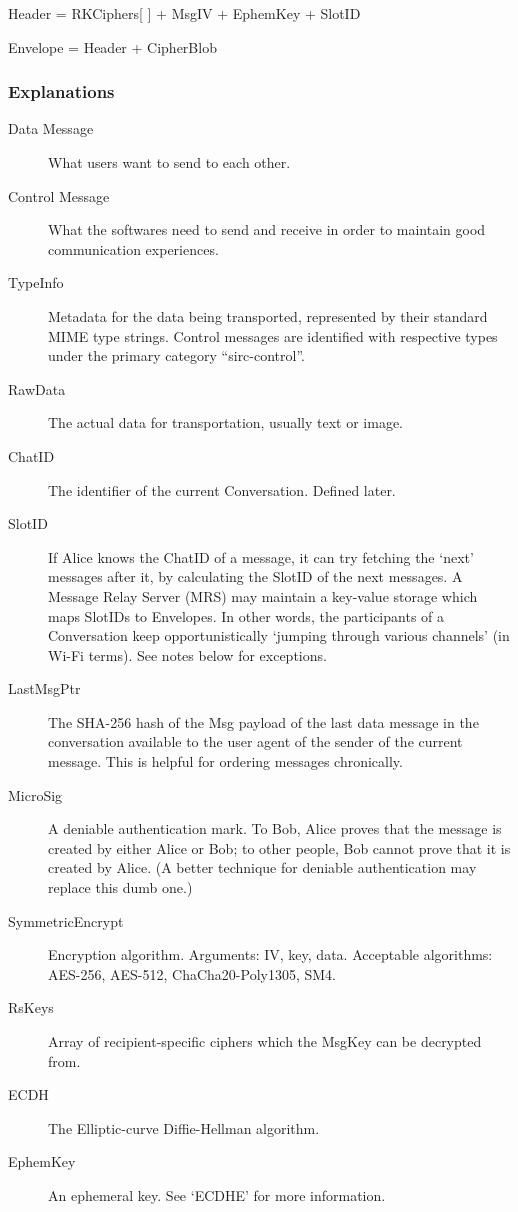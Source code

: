 \documentclass[a4paper,11pt]{article}
\begin{document}
\istep Header = RKCiphers[ ] + MsgIV + EphemKey + SlotID

\istep Envelope = Header + CipherBlob

\istepend

\subsubsection{Explanations}

\begin{description}
    \item[Data Message] What users want to send to each other.
    \item[Control Message] What the softwares need to send and receive in order to maintain good communication experiences.
    \item[TypeInfo] Metadata for the data being transported, represented by their standard MIME type strings.
        Control messages are identified with respective types under the primary category ``sirc-control''.
    \item[RawData] The actual data for transportation, usually text or image.
    \item[ChatID] The identifier of the current Conversation. Defined later.
    \item[SlotID] If Alice knows the ChatID of a message, it can try fetching the `next' messages after it, by calculating the SlotID of the next messages. A Message Relay Server (MRS) may maintain a key-value storage which maps SlotIDs to Envelopes. In other words, the participants of a Conversation keep opportunistically `jumping through various channels' (in Wi-Fi terms). See notes below for exceptions.
    \item[LastMsgPtr] The SHA-256 hash of the Msg payload of the last data message in the conversation available to the user agent of the sender of the current message. This is helpful for ordering messages chronically.
    \item[MicroSig] A deniable authentication mark. To Bob, Alice proves that the message is created by either Alice or Bob; to other people, Bob cannot prove that it is created by Alice. (A better technique for deniable authentication may replace this dumb one.)
    \item[SymmetricEncrypt] Encryption algorithm. Arguments: IV, key, data. Acceptable algorithms: AES-256, AES-512, ChaCha20-Poly1305, SM4.
    \item[RsKeys] Array of recipient-specific ciphers which the MsgKey can be decrypted from.
    \item[ECDH] The Elliptic-curve Diffie-Hellman algorithm.
    \item[EphemKey] An ephemeral key. See `ECDHE' for more information.
\end{description}
\end{document}
